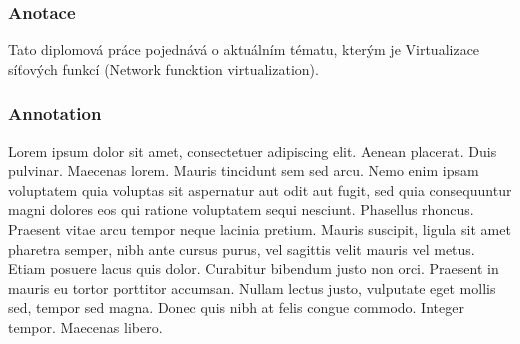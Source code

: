 \documentclass[a4paper,czech,czech,openright,cleardoubleempty,BCOR10mm,DIV11]{scrreprt}
\begin{document}
\subsubsection{Anotace}

Tato diplomová práce pojednává o aktuálním tématu, kterým je Virtualizace síťových funkcí (Network funcktion virtualization). 

\subsubsection{Annotation}

Lorem ipsum dolor sit amet, consectetuer adipiscing elit. Aenean placerat. Duis pulvinar. Maecenas lorem. Mauris tincidunt sem sed arcu. Nemo enim ipsam voluptatem quia voluptas sit aspernatur aut odit aut fugit, sed quia consequuntur magni dolores eos qui ratione voluptatem sequi nesciunt. Phasellus rhoncus. Praesent vitae arcu tempor neque lacinia pretium. Mauris suscipit, ligula sit amet pharetra semper, nibh ante cursus purus, vel sagittis velit mauris vel metus. Etiam posuere lacus quis dolor. Curabitur bibendum justo non orci. Praesent in mauris eu tortor porttitor accumsan. Nullam lectus justo, vulputate eget mollis sed, tempor sed magna. Donec quis nibh at felis congue commodo. Integer tempor. Maecenas libero.


\cleardoublepage{}

{\small %
}{\small \par}

\cleardoublepage{}\thispagestyle{empty}{\small 


\tableofcontents{}%
\cleardoublepage{}}{\small \par}













\cleardoublepage{}




\end{document}
